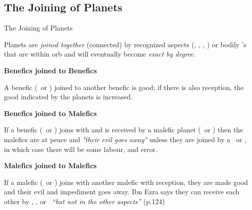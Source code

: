 \subsection{The Joining of Planets}
\begin{frame}[t]{The Joining of Planets}
\begin{block}{}
 Planets are \textsl{joined together} (connected) by recognized aspects (\Sextile, \Square, \Trine, \Opposition) or bodily \Conjunction's that are within orb and will eventually become \textsl{exact by degree}.
 \end{block}
\textbf{Benefics joined to Benefics}\footnotemark[1]

A benefic (\Venus\ or \Jupiter) joined to another benefic is good; if there is also reception, the good indicated by the planets is increased.

\textbf{Benefics joined to Malefics}

If a benefic (\Venus\ or \Jupiter) joins with and is received by a malefic planet (\Mars\ or \Saturn) then the malefics are at peace and \textsl{"their evil goes away"} unless they are joined by a \Square\ or \Opposition, in which case there will be some labour, and error.

\textbf{Malefics joined to Malefics}

If a malefic (\Mars\ or \Saturn) joins with another malefic with reception, they are made good and their evil and impediment goes away. Ibn Ezra says they can receive each other by \Conjunction, \Sextile, or \Trine\  \textsl{``but not in the other aspects''} (p.124)
\vspace{0.5cm}

\end{frame}